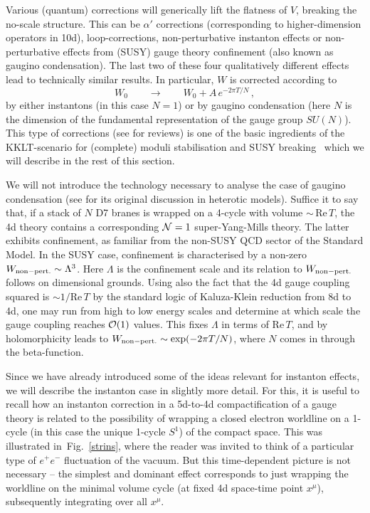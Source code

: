 \documentclass[12pt]{article}
\newcommand{\be}{\begin{equation}}
\newcommand{\ee}{\end{equation}}
\numberwithin{equation}{section}
\begin{document}
Various (quantum) corrections will generically lift the flatness of $V$, breaking the no-scale structure. This can be $\alpha'$ corrections (corresponding to higher-dimension operators in 10d), loop-corrections, non-perturbative instanton effects or non-perturbative effects from (SUSY) gauge theory confinement (also known as gaugino condensation). The last two of these four qualitatively different effects lead to technically similar results. In particular, $W$ is corrected according to
\be
W_0\qquad\rightarrow \qquad W_0+A\,e^{-2\pi T/N}\,,
\ee
by either instantons (in this case $N=1$) or by gaugino condensation (here $N$ is the dimension of the fundamental representation of the gauge group $SU(N)$). 
This type of corrections (see \cite{Blumenhagen:2009qh, Bianchi:2007ft} for reviews) is one of the basic ingredients of the KKLT-scenario for (complete) moduli stabilisation and SUSY breaking~\cite{Kachru:2003aw} which we will describe in the rest of this section.

We will not introduce the technology necessary to analyse the case of gaugino condensation (see \cite{Derendinger:1985kk, Dine:1985rz} for its original discussion in heterotic models). Suffice it to say that, if a stack of $N$ D7 branes is wrapped on a 4-cycle with volume $\sim\,$Re$\,T$, the 4d theory contains a corresponding ${\cal N}=1$ super-Yang-Mills theory. The latter exhibits confinement, as familiar from the non-SUSY QCD sector of the Standard Model. In the SUSY case, confinement is characterised by a non-zero $W_{\rm non-pert.}\sim \Lambda^3$. Here $\Lambda$ is the confinement scale and its relation to $W_{\rm non-pert.}$ follows on dimensional grounds. Using also the fact that the 4d gauge coupling squared is $\sim 1/$Re$\,T$ by the standard logic of Kaluza-Klein reduction from 8d to 4d, one may run from high to low energy scales and determine at which scale the gauge coupling reaches ${\cal O}(1)$ values. This fixes $\Lambda$ in terms of Re$\,T$, and by holomorphicity leads to $W_{\rm non-pert.}\sim \exp(-2\pi T/N)$, where $N$ comes in through the beta-function.

Since we have already introduced some of the ideas relevant for instanton effects, we will describe the instanton case in slightly more detail. For this, it is useful to recall how an instanton correction in a 5d-to-4d compactification of a gauge theory is related to the possibility of wrapping a closed electron worldline on a 1-cycle (in this case the unique 1-cycle $S^1$) of the compact space. This was illustrated in~Fig.~\ref{strins}, where the reader was invited to think of a particular type of $e^+e^-$ fluctuation of the vacuum. But this time-dependent picture is not necessary -- the simplest and dominant effect corresponds to just wrapping the worldline on the minimal volume cycle (at fixed 4d space-time point $x^\mu$), subsequently integrating over all $x^\mu$. 
\end{document}

